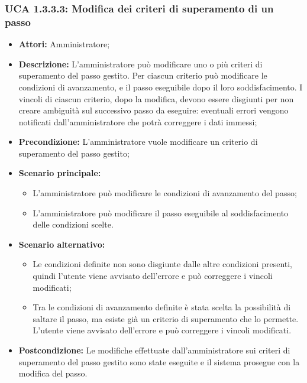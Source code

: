 \subsubsection{UCA 1.3.3.3: Modifica dei criteri di superamento di un passo}
\begin{itemize}
\item \textbf{Attori:}
 Amministratore;
\item \textbf{Descrizione:} 
L'amministratore può modificare uno o più criteri di superamento del passo gestito.
Per ciascun criterio può modificare le condizioni di avanzamento, e il passo eseguibile dopo il loro soddisfacimento.
I vincoli di ciascun criterio, dopo la modifica, devono essere disgiunti per non creare ambiguità sul successivo passo da eseguire: eventuali
errori vengono notificati dall'amministratore che potrà correggere i dati immessi;
\item \textbf{Precondizione:}
 L'amministratore vuole modificare un criterio di superamento del passo gestito;
\item \textbf{Scenario principale:} 
\begin{itemize}
\item L'amministratore può modificare le condizioni di avanzamento del passo;
\item L'amministratore può modificare il passo eseguibile al soddisfacimento delle condizioni scelte.
\end{itemize}
\item \textbf{Scenario alternativo:}
\begin{itemize}
\item Le condizioni definite non sono disgiunte dalle altre condizioni presenti, quindi l'utente viene avvisato dell'errore e può correggere i vincoli modificati;
\item Tra le condizioni di avanzamento definite è stata scelta la possibilità di saltare il passo, ma esiste già un criterio di superamento che lo permette. L'utente viene avvisato dell'errore e può correggere i vincoli modificati.
\end{itemize}
\item \textbf{Postcondizione:}
 Le modifiche effettuate dall'amministratore sui criteri di superamento del passo gestito sono state eseguite e il sistema prosegue con la modifica del passo. 
\end{itemize}

\hypertarget{A1.3.3.3.1}{}
